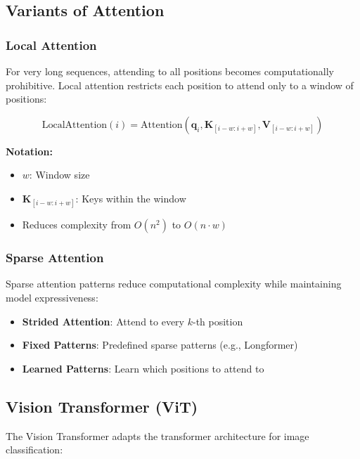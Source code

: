 \documentclass[11pt]{article}
\begin{document}
\subsection{Variants of Attention}

\subsubsection{Local Attention}

For very long sequences, attending to all positions becomes computationally prohibitive. Local attention restricts each position to attend only to a window of positions:

\begin{equation}
\text{LocalAttention}(i) = \text{Attention}(\mathbf{q}_i, \mathbf{K}_{[i-w:i+w]}, \mathbf{V}_{[i-w:i+w]})
\end{equation}
\begin{notationbox}
\textbf{Notation:}
\begin{itemize}
    \item $w$: Window size
    \item $\mathbf{K}_{[i-w:i+w]}$: Keys within the window
    \item Reduces complexity from $O(n^2)$ to $O(n \cdot w)$
\end{itemize}
\end{notationbox}

\subsubsection{Sparse Attention}

Sparse attention patterns reduce computational complexity while maintaining model expressiveness:

\begin{itemize}
    \item \textbf{Strided Attention}: Attend to every $k$-th position
    \item \textbf{Fixed Patterns}: Predefined sparse patterns (e.g., Longformer)
    \item \textbf{Learned Patterns}: Learn which positions to attend to
\end{itemize}

\subsection{Vision Transformer (ViT)}

The Vision Transformer adapts the transformer architecture for image classification:
\end{document}

